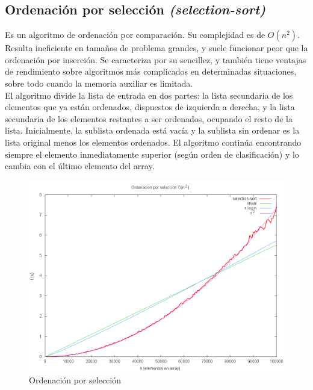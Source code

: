 \subsection{Ordenación por selección \textit{(selection-sort)}}
Es un algoritmo de ordenación por comparación. Su complejidad es de $O(n^2)$. Resulta ineficiente en tamaños de problema grandes, y suele funcionar peor que la ordenación por inserción. Se caracteriza por su sencillez, y también tiene ventajas de rendimiento sobre algoritmos más complicados en determinadas situaciones, sobre todo cuando la memoria auxiliar es limitada.\\
El algoritmo divide la lista de entrada en dos partes: la lista secundaria de los elementos que ya están ordenados, dispuestos de izquierda a derecha, y la lista secundaria de los elementos restantes a ser ordenados, ocupando el resto de la lista. Inicialmente, la sublista ordenada está vacía y la sublista sin ordenar es la lista original menos los elementos ordenados. El algoritmo continúa encontrando siempre el elemento inmediatamente superior (según orden de clasificación) y lo cambia con el último elemento del array.

	\begin{figure}[H]
	  \centering
	    \includegraphics[width=1.0\textwidth]{selection-sort.png}
	  \caption{Ordenación por selección}
	  \label{fig:selection}
	\end{figure}

\newpage
